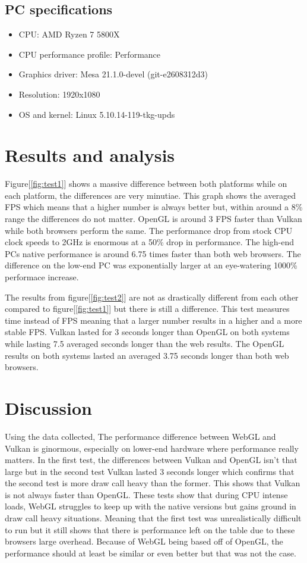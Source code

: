 \documentclass{article}
\begin{document}
\subsection {PC specifications}
\begin{itemize}
    \item CPU: AMD Ryzen 7 5800X
    \item CPU performance profile: Performance
    \item Graphics driver: Mesa 21.1.0-devel (git-e2608312d3)
    \item Resolution: 1920x1080
    \item OS and kernel: Linux 5.10.14-119-tkg-upds
\end{itemize}


\section {Results and analysis}
Figure[\ref{fig:test1}] shows a massive difference between both platforms while on each platform, the differences are very minutiae. This graph shows the averaged FPS which means that a higher number is always better but, within around a 8\% range the differences do not matter. OpenGL is around 3 FPS faster than Vulkan while both browsers perform the same. The performance drop from stock CPU clock speeds to 2GHz is enormous at a 50\% drop in performance. The high-end PCs native performance is around 6.75 times faster than both web browsers. The difference on the low-end PC was exponentially larger at an eye-watering 1000\% performace increase.

The results from figure[\ref{fig:test2}] are not as drastically different from each other compared to figure[\ref{fig:test1}] but there is still a difference. This test measures time instead of FPS meaning that a larger number results in a higher and a more stable FPS. Vulkan lasted for 3 seconds longer than OpenGL on both systems while lasting 7.5 averaged seconds longer than the web results. The OpenGL results on both systems lasted an averaged 3.75 seconds longer than both web browsers.

\section {Discussion}
Using the data collected, The performance difference between WebGL and Vulkan is ginormous, especially on lower-end hardware where performance really matters. In the first test, the differences between Vulkan and OpenGL isn't that large but in the second test Vulkan lasted 3 seconds longer which confirms that the second test is more draw call heavy than the former. This shows that Vulkan is not always faster than OpenGL. These tests show that during CPU intense loads, WebGL struggles to keep up with the native versions but gains ground in draw call heavy situations. Meaning that the first test was unrealistically difficult to run but it still shows that there is performance left on the table due to these browsers large overhead. Because of WebGL being based off of OpenGL, the performance should at least be similar or even better but that was not the case.
\end{document}
